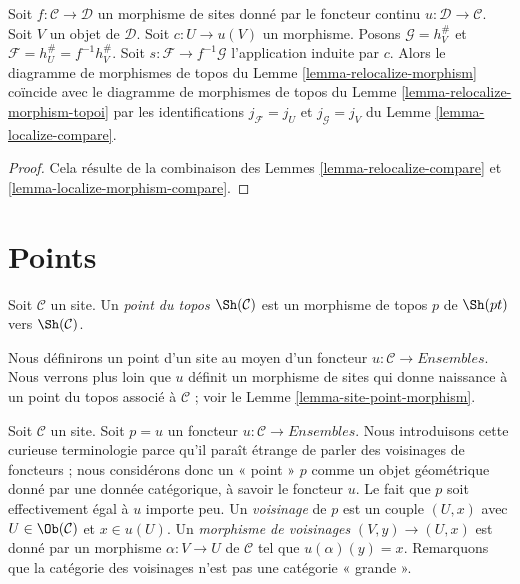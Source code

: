 \begin{lemma}
\label{lemma-relocalize-morphism-compare}
Soit $f : \mathcal{C} \to \mathcal{D}$ un morphisme de sites donné par le
foncteur continu $u : \mathcal{D} \to \mathcal{C}$.
Soit $V$ un objet de $\mathcal{D}$. Soit $c : U \to u(V)$ un morphisme.
Posons $\mathcal{G} = h_V^\#$ et
$\mathcal{F} = h_U^\# = f^{-1}h_V^\#$.
Soit $s : \mathcal{F} \to f^{-1}\mathcal{G}$ l’application induite par $c$.
Alors le diagramme de morphismes de topos du
Lemme \ref{lemma-relocalize-morphism} coïncide avec le diagramme de morphismes
de topos du Lemme \ref{lemma-relocalize-morphism-topoi} par les identifications
$j_\mathcal{F} = j_U$ et $j_\mathcal{G} = j_V$ du
Lemme \ref{lemma-localize-compare}.
\end{lemma}

\begin{proof}
Cela résulte de la combinaison des Lemmes \ref{lemma-relocalize-compare} et
\ref{lemma-localize-morphism-compare}.
\end{proof}















\section{Points}
\label{section-points}

\begin{definition}
\label{definition-point-topos}
Soit $\mathcal{C}$ un site.
Un {\it point du topos $\Sh(\mathcal{C})$} est un morphisme de topos $p$ de
$\Sh(pt)$ vers $\Sh(\mathcal{C})$.
\end{definition}

\noindent
Nous définirons un point d’un site au moyen d’un foncteur
$u : \mathcal{C} \to \textit{Ensembles}$.
Nous verrons plus loin que $u$ définit un morphisme de sites qui donne
naissance à un point du topos associé à $\mathcal{C}$ ; voir le
Lemme \ref{lemma-site-point-morphism}.

\medskip\noindent
Soit $\mathcal{C}$ un site. Soit $p = u$ un foncteur
$u : \mathcal{C} \to \textit{Ensembles}$.
Nous introduisons cette curieuse terminologie parce qu’il paraît étrange de
parler des voisinages de foncteurs ; nous considérons donc un « point » $p$
comme un objet géométrique donné par une donnée catégorique, à savoir le
foncteur $u$. Le fait que $p$ soit effectivement égal à $u$ importe peu.
Un {\it voisinage} de $p$ est un couple $(U, x)$ avec
$U \in \Ob(\mathcal{C})$ et $x \in u(U)$.
Un {\it morphisme de voisinages} $(V, y) \to (U, x)$ est donné par un
morphisme $\alpha :V \to U$ de $\mathcal{C}$ tel que
$u(\alpha)(y) = x$. Remarquons que la catégorie des voisinages n’est pas une
catégorie « grande ».

